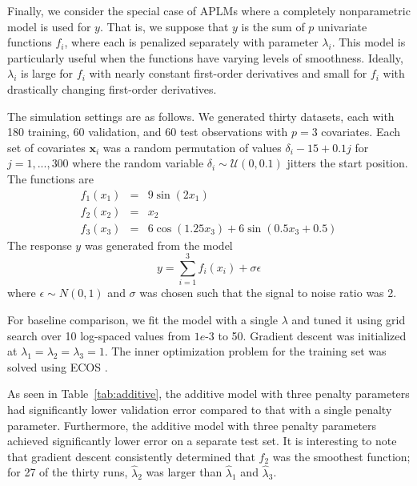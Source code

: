 \documentclass{statsoc}
\begin{document}
Finally, we consider the special case of APLMs where a completely nonparametric model is used for $y$. That is, we suppose that $y$ is the sum of $p$ univariate functions $f_i$, where each is penalized separately with parameter $\lambda_i$. This model is particularly useful when the functions have varying levels of smoothness. Ideally, $\lambda_i$ is large for $f_i$ with nearly constant first-order derivatives and small for $f_i$ with drastically changing first-order derivatives. 

The simulation settings are as follows. We generated thirty datasets, each with 180 training, 60 validation, and 60 test observations with $p=3$ covariates. Each set of covariates $\boldsymbol{x}_i$ was a random permutation of values $\delta_i - 15 + 0.1 j$ for $j=1,...,300$ where the random variable $\delta_i \sim \mathcal{U}(0, 0.1)$ jitters the start position. The functions are 
\begin{equation}
\begin{array}{ccl}
f_1(x_1) &=& 9 \sin(2x_1)\\
f_2(x_2) &=& x_2 \\
f_3(x_3) &=& 6 \cos(1.25 x_3) + 6 \sin(0.5 x_3 + 0.5)
\end{array}
\end{equation}
The response $y$ was generated from the model 
\begin{equation}
y=\sum _{i=1}^3 f_i(x_i) + \sigma \epsilon
\end{equation}
where $\epsilon \sim N(0, 1)$ and $\sigma$ was chosen such that the signal to noise ratio was 2.

For baseline comparison, we fit the model with a single $\lambda$ and tuned it using grid search over 10 log-spaced values from $1e$-3 to 50. Gradient descent was initialized at $\lambda_1=\lambda_2=\lambda_3=1$. The inner optimization problem for the training set was solved using ECOS \citep{Domahidi2013ecos}.

As seen in Table~\ref{tab:additive}, the additive model with three penalty parameters had significantly lower validation error compared to that with a single penalty parameter. Furthermore, the additive model with three penalty parameters achieved significantly lower error on a separate test set. It is interesting to note that gradient descent consistently determined that $f_2$ was the smoothest function; for 27 of the thirty runs, $\hat{\lambda}_2$ was larger than $\hat{\lambda}_1$ and $\hat{\lambda}_3$.
\end{document}
